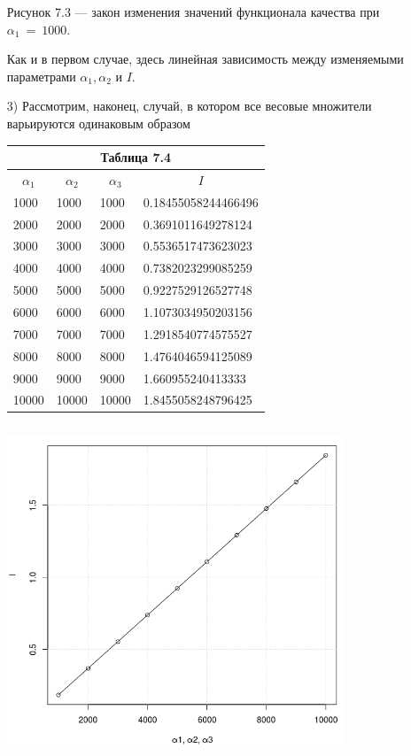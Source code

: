 \documentclass[14pt]{extreport}
\begin{document}
\begin{itemize}
\begin{center}
Рисунок 7.3 --- закон изменения значений функционала качества при $\alpha_1\ =\ 1000$. 
\end{center}

Как и в первом случае, здесь линейная зависимость между изменяемыми параметрами $\alpha_1, \alpha_2$ и $I$.

\item[3)] Рассмотрим, наконец, случай, в котором все весовые множители варьируются одинаковым образом  

\begin{center}
   \begin{tabular}{ |l|l|l|l| }
   \multicolumn{4}{c}{Таблица 7.4}\\
    \hline
    \multicolumn{1}{|c|}{$\alpha_1$} & \multicolumn{1}{c|}{$\alpha_2$} & \multicolumn{1}{c|}{$\alpha_3$} & \multicolumn{1}{c|}{$I$} \\ \hline
    1000 & 1000 & 1000 & 0.18455058244466496   \\ \hline
    2000 & 2000 & 2000 & 0.3691011649278124  \\ \hline
    3000 & 3000 & 3000 & 0.5536517473623023  \\ \hline
    4000 & 4000 & 4000 & 0.7382023299085259  \\ \hline
    5000 & 5000 & 5000 & 0.9227529126527748  \\ \hline
    6000 & 6000 & 6000 & 1.1073034950203156  \\ \hline
    7000 & 7000 & 7000 & 1.2918540774575527  \\ \hline
    8000 & 8000 & 8000 & 1.4764046594125089  \\ \hline
    9000 & 9000 & 9000 & 1.660955240413333 \\ \hline
    10000 & 10000 & 10000 &  1.8455058248796425 \\ \hline
  \end{tabular}             
\end{center}

\begin{center}
\includegraphics[width=10cm, height=10cm]{laa3.png}


\end{center}
\end{itemize}
\end{document}
